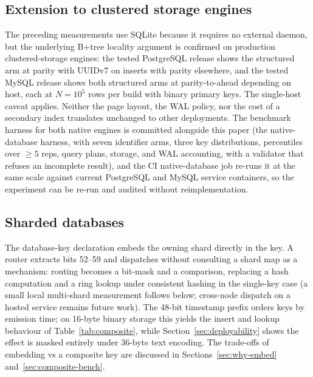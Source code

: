 \documentclass{svproc}
\begin{document}
\subsection{Extension to clustered storage engines}
The preceding measurements use SQLite because it requires no external daemon, but the underlying B+\!tree locality argument is confirmed on production clustered-storage engines: the tested PostgreSQL release shows the structured arm at parity with UUIDv7 on inserts with parity elsewhere, and the tested MySQL release shows both structured arms at parity-to-ahead depending on host, each at $N=10^5$ rows per build with binary primary keys. The single-host caveat applies. Neither the page layout, the WAL policy, nor the cost of a secondary index translates unchanged to other deployments. The benchmark harness for both native engines is committed alongside this paper (the native-database harness, with seven identifier arms, three key distributions, percentiles over $\geq 5$ reps, query plans, storage, and WAL accounting, with a validator that refuses an incomplete result), and the CI native-database job re-runs it at the same scale against current PostgreSQL and MySQL service containers, so the experiment can be re-run and audited without reimplementation.


\subsection{Sharded databases}
The database-key declaration embeds the owning shard directly in the key.
A router extracts bits 52--59 and dispatches without consulting a
shard map as a mechanism: routing becomes a bit-mask and a comparison, replacing a
hash computation and a ring lookup under consistent hashing in the single-key case
(a small local multi-shard measurement follows below; cross-node dispatch on a hosted service remains future work). The 48-bit timestamp prefix orders keys by emission
time; on 16-byte binary storage this yields the insert and lookup
behaviour of Table~\ref{tab:composite}, while
Section~\ref{sec:deployability} shows the effect is masked entirely
under 36-byte text encoding.
The trade-offs of embedding vs a composite key are discussed in
Sections~\ref{sec:why-embed} and~\ref{sec:composite-bench}.
\end{document}
